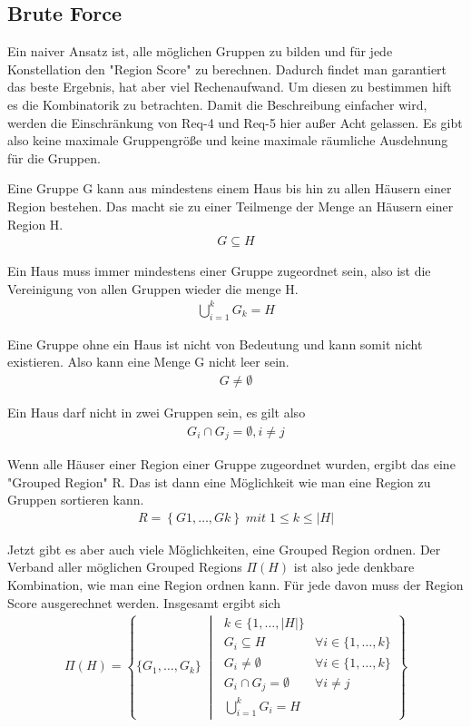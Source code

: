 \subsection{Brute Force}
Ein naiver Ansatz ist, alle möglichen Gruppen zu bilden und für jede Konstellation den "Region Score" zu berechnen. Dadurch findet man garantiert das beste Ergebnis, hat aber viel Rechenaufwand. Um diesen zu bestimmen hift es die Kombinatorik zu betrachten. Damit die Beschreibung einfacher wird, werden die Einschränkung von Req-4 und Req-5 hier außer Acht gelassen. Es gibt also keine maximale Gruppengröße und keine maximale räumliche Ausdehnung für die Gruppen.

Eine Gruppe G kann aus mindestens einem Haus bis hin zu allen Häusern einer Region bestehen. Das macht sie zu einer Teilmenge der Menge an Häusern einer Region H.
\begin{align}
    G \subseteq H
\end{align}

Ein Haus muss immer mindestens einer Gruppe zugeordnet sein, also ist die
Vereinigung von allen Gruppen wieder die menge H.
\begin{align}  
    \bigcup_{i=1}^{k}G_{k} = H
\end{align}

Eine Gruppe ohne ein Haus ist nicht von Bedeutung und kann somit nicht existieren. Also kann eine Menge G nicht leer sein.
\begin{align}
    G \neq \emptyset 
\end{align}

Ein Haus darf nicht in zwei Gruppen sein, es gilt also
\begin{align}
    G_{i} \cap G_{j} = \emptyset, i\neq j
\end{align}


Wenn alle Häuser einer Region einer Gruppe zugeordnet wurden, ergibt das eine "Grouped Region" R. Das ist dann eine Möglichkeit wie man eine Region zu Gruppen sortieren kann. 
\begin{align}
    R = \left\{ G1, \dots, Gk \right\} \; mit \; 1 \le k \le |H|
\end{align}

Jetzt gibt es aber auch viele Möglichkeiten, eine Grouped Region ordnen. Der Verband aller möglichen Grouped Regions $\Pi(H)$ ist also jede denkbare Kombination, wie man eine Region ordnen kann. Für jede davon muss der Region Score ausgerechnet werden. Insgesamt ergibt sich
\begin{align}
  \Pi(H) = 
  \left\{ 
    \{G_1,\dots,G_k\}
  \;\middle|\;
    \begin{array}{ll}
      k\in\{1,\dots,|H|\}\\
      G_i\subseteq H & \forall i\in\{1,\dots,k\}\\
      G_i\neq\emptyset & \forall i\in\{1,\dots,k\}\\
      G_i\cap G_j=\emptyset & \forall i\neq j\\
      \displaystyle\bigcup_{i=1}^{k}G_i=H
    \end{array}
  \right\}
\end{align}

